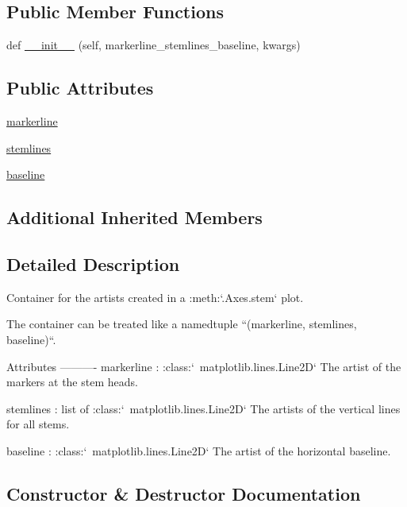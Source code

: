 \subsection*{Public Member Functions}
\begin{DoxyCompactItemize}
\item 
def \hyperlink{classmatplotlib_1_1container_1_1StemContainer_a904ff4a21d4c0a832f2d9731b97dd847}{\+\_\+\+\_\+init\+\_\+\+\_\+} (self, markerline\+\_\+stemlines\+\_\+baseline, kwargs)
\end{DoxyCompactItemize}
\subsection*{Public Attributes}
\begin{DoxyCompactItemize}
\item 
\hyperlink{classmatplotlib_1_1container_1_1StemContainer_a0505bcfecff8a468c6cf9eacfb82440d}{markerline}
\item 
\hyperlink{classmatplotlib_1_1container_1_1StemContainer_acbb7cbd106a50104761f2f1ff0d17561}{stemlines}
\item 
\hyperlink{classmatplotlib_1_1container_1_1StemContainer_ae065c5f71a87b080bdbe15320f144eae}{baseline}
\end{DoxyCompactItemize}
\subsection*{Additional Inherited Members}


\subsection{Detailed Description}
\begin{DoxyVerb}Container for the artists created in a :meth:`.Axes.stem` plot.

The container can be treated like a namedtuple ``(markerline, stemlines,
baseline)``.

Attributes
----------
markerline :  :class:`~matplotlib.lines.Line2D`
    The artist of the markers at the stem heads.

stemlines : list of :class:`~matplotlib.lines.Line2D`
    The artists of the vertical lines for all stems.

baseline : :class:`~matplotlib.lines.Line2D`
    The artist of the horizontal baseline.
\end{DoxyVerb}
 

\subsection{Constructor \& Destructor Documentation}
\mbox{\label{classmatplotlib_1_1container_1_1StemContainer_a904ff4a21d4c0a832f2d9731b97dd847}} 
